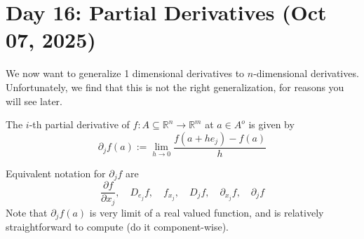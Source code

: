 \section{Day 16: Partial Derivatives (Oct 07, 2025)}

We now want to generalize 1 dimensional derivatives to $n$-dimensional derivatives. Unfortunately, we find that this is not the right generalization, for reasons you will see later.

\begin{definition}
The $i$-th partial derivative of $f : A \subseteq \mathbb{R}^n \to \mathbb{R}^m$ at $a \in A^o$ is given by
\[
    \partial_j f(a) := \lim_{ h \to 0 } \frac{f(a + he_j) - f(a)}{h}
\]
\end{definition}

Equivalent notation for $\partial_j f$ are
\[
\frac{\partial f}{\partial x_j}, \quad D_{e_j} f, \quad f_{x_j}, \quad D_jf, \quad \partial_{x_j}f, \quad \partial_j f
\]
Note that $\partial_j f(a)$ is very limit of a real valued function, and is relatively straightforward to compute (do it component-wise).\\

